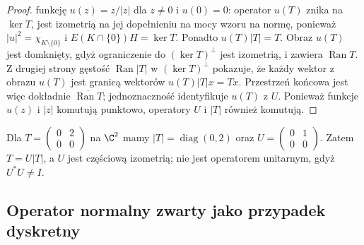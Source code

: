 \begin{proof}
funkcję $u(z)=z/|z|$ dla $z\ne0$ i $u(0)=0$:
operator $u(T)$ znika na $\ker T$, jest izometrią na
jej dopełnieniu na mocy wzoru na normę, ponieważ
$|u|^2=\chi_{K\setminus\{0\}}$ i
$E(K\cap\{0\})H=\ker T$. Ponadto $u(T)|T|=T$.
Obraz $u(T)$ jest domknięty, gdyż ograniczenie do
$(\ker T)^\perp$ jest izometrią, i zawiera
$\operatorname{Ran}T$. Z drugiej strony gęstość
$\operatorname{Ran}|T|$ w $(\ker T)^\perp$ pokazuje, że każdy
wektor z obrazu $u(T)$ jest granicą wektorów
$u(T)|T|x=Tx$. Przestrzeń końcowa jest więc dokładnie
$\overline{\operatorname{Ran}T}$; jednoznaczność identyfikuje
$u(T)$ z $U$.
Ponieważ funkcje $u(z)$ i $|z|$ komutują punktowo,
operatory $U$ i $|T|$ również komutują.
\end{proof}

\begin{przyklad}
Dla $T=\left(\begin{smallmatrix}0&2\\0&0\end{smallmatrix}\right)$
na $\C^2$ mamy
$|T|=\operatorname{diag}(0,2)$ oraz
$U=\left(\begin{smallmatrix}0&1\\0&0\end{smallmatrix}\right)$.
Zatem $T=U|T|$, a $U$ jest częściową izometrią;
nie jest operatorem unitarnym, gdyż $U^*U\ne I$.
\end{przyklad}

\subsection{Operator normalny zwarty jako przypadek dyskretny}

